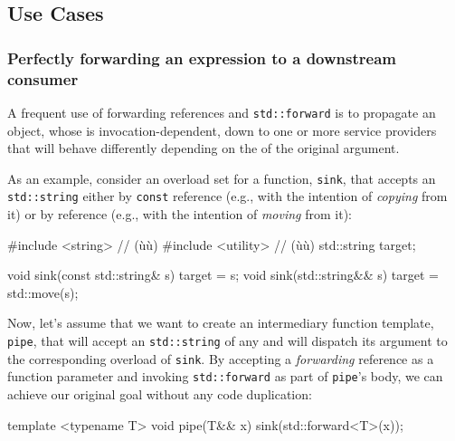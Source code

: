 \subsection[Use Cases]{Use Cases}\label{use-cases-forwardingref}

\subsubsection[Perfectly forwarding an expression to a downstream consumer]{Perfectly forwarding an expression to a downstream consumer}\label{perfectly-forwarding-an-expression-to-a-downstream-consumer}

A frequent use of forwarding references and \lstinline!std::forward! is to
propagate an object, whose  is
invocation-dependent, down to one or more service providers that will
behave differently depending on the  of the
original argument.

As an example, consider an overload set for a function, \lstinline!sink!,
that accepts an \lstinline!std::string! either by \lstinline!const!
 reference (e.g., with the intention of \textit{copying} from it) or by
 reference (e.g., with the intention of \textit{moving} from it):

\begin{emcppshiddenlisting}[emcppsbatch=e8]
#include <string>   // (ù{}ù)
#include <utility>  // (ù{}ù)
std::string target;
\end{emcppshiddenlisting}
\begin{emcppslisting}[emcppsbatch=e8]
void sink(const std::string& s) { target = s; }
void sink(std::string&& s)      { target = std::move(s); }
\end{emcppslisting}

\noindent Now, let's assume that we want to create an intermediary function
template, \lstinline!pipe!, that will accept an \lstinline!std::string! of any
 and will dispatch its argument to the
corresponding overload of \lstinline!sink!. By accepting a
\emph{forwarding} reference as a function parameter and invoking
\lstinline!std::forward! as part of \lstinline!pipe!'s body, we can achieve
our original goal without any code duplication:

\begin{emcppslisting}[emcppsbatch=e8]
template <typename T>
void pipe(T&& x)
{
    sink(std::forward<T>(x));
}
\end{emcppslisting}

